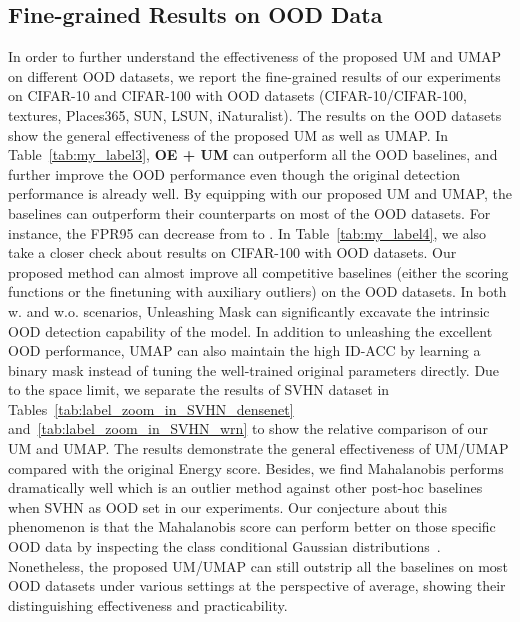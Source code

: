 \documentclass{article}
\theoremstyle{plain}
\theoremstyle{definition}
\theoremstyle{remark}
\begin{document}
\subsection{Fine-grained Results on OOD Data}
\label{app:exp_finegrained}

In order to further understand the effectiveness of the proposed UM and UMAP on different OOD datasets, we report the fine-grained results of our experiments on CIFAR-10 and CIFAR-100 with  OOD datasets (CIFAR-10/CIFAR-100, textures, Places365, SUN, LSUN, iNaturalist). 
The results on the  OOD datasets show the general effectiveness of the proposed UM as well as UMAP. 
In Table~\ref{tab:my_label3}, \textbf{OE + UM} can outperform all the OOD baselines, and further improve the OOD performance even though the original detection performance is already well. By equipping with our proposed UM and UMAP, the baselines can outperform their counterparts on most of the OOD datasets. For instance, the FPR95 can decrease from  to . In Table~\ref{tab:my_label4}, we also take a closer check about results on CIFAR-100 with  OOD datasets. Our proposed method can almost improve all competitive baselines (either the scoring functions or the finetuning with auxiliary outliers) on the  OOD datasets. In both w.  and w.o.  scenarios, Unleashing Mask can significantly excavate the intrinsic OOD detection capability of the model. In addition to unleashing the excellent OOD performance, UMAP can also maintain the high ID-ACC by learning a binary mask instead of tuning the well-trained original parameters directly. Due to the space limit, we separate the results of SVHN dataset in Tables~\ref{tab:label_zoom_in_SVHN_densenet} and~\ref{tab:label_zoom_in_SVHN_wrn} to show the relative comparison of our UM and UMAP. The results demonstrate the general effectiveness of UM/UMAP compared with the original Energy score. Besides, we find Mahalanobis performs dramatically well which is an outlier method against other post-hoc baselines when SVHN as OOD set in our experiments. Our conjecture about this phenomenon is that the Mahalanobis score can perform better on those specific OOD data by inspecting the class conditional Gaussian distributions~\citep{LeeLLS18}. Nonetheless, the proposed UM/UMAP can still outstrip all the baselines on most OOD datasets under various settings at the perspective of average, showing their distinguishing effectiveness and practicability.
\end{document}
